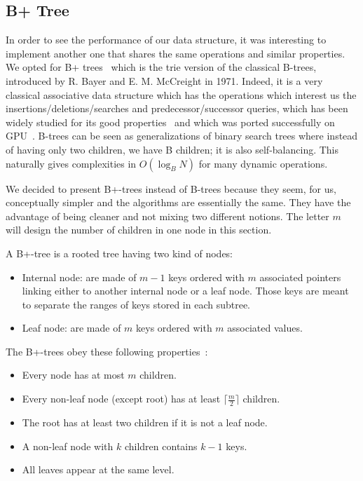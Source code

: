 \subsection{B+ Tree}\label{BTREE}

In order to see the performance of our data structure, it was interesting to implement another one that shares the same operations and similar properties. We opted for B+ trees~\cite{comer1979ubiquitous} which is the trie version of the classical B-trees, introduced by R. Bayer and E. M. McCreight in 1971. Indeed, it is a very classical associative data structure which has the operations which interest us the insertions/deletions/searches and predecessor/successor queries, which has been widely studied for its good properties~\cite{bender2005cache} and which was ported successfully on GPU~\cite{fix2011accelerating}. B-trees can be seen as generalizations of binary search trees where instead of having only two children, we have B children; it is also self-balancing. This naturally gives complexities in $O(\log_{B} N)$ for many dynamic operations.

We decided to present B+-trees instead of B-trees because they seem, for us, conceptually simpler and the algorithms are essentially the same. They have the advantage of being cleaner and not mixing two different notions. The letter $m$ will design the number of children in one node in this section.

A B+-tree is a rooted tree having two kind of nodes:
\begin{itemize}
    \item Internal node: are made of $m - 1$ keys ordered with $m$ associated pointers linking either to another internal node or a leaf node. Those keys are meant to separate the ranges of keys stored in each subtree.
    \item Leaf node: are made of $m$ keys ordered with $m$ associated values.\\
\end{itemize}

The B+-trees obey these following properties~\cite{comer1979ubiquitous}:
\begin{itemize}
    \item Every node has at most $m$ children.
    \item Every non-leaf node (except root) has at least $\lceil \frac{m}{2} \rceil$ children.
    \item The root has at least two children if it is not a leaf node.
    \item A non-leaf node with $k$ children contains $k-1$ keys.
    \item All leaves appear at the same level.\\
\end{itemize}

